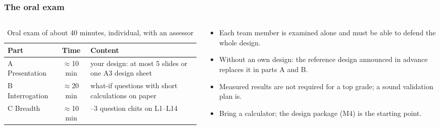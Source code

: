 \begin{frame}
	\frametitle{The oral exam}
	\begin{columns}[T]
		\begin{column}{0.56\textwidth}
			\begin{table}
				\centering
				\footnotesize
				\begin{tabular}{|l|c|>{\raggedright\arraybackslash}p{3.3cm}|}
					\hline
					\textbf{Part}   & \textbf{Time}    & \textbf{Content}                                     \\
					\hline
					A Presentation  & $\approx$10\,min & your design: at most 5 slides or one A3 design sheet \\
					B Interrogation & $\approx$20\,min & what-if questions with short calculations on paper   \\
					C Breadth       & $\approx$10\,min & 2--3 question chits on L1--L14                       \\
					\hline
				\end{tabular}
				\caption{Oral exam of about 40 minutes, individual, with an assessor}
			\end{table}
		\end{column}
		\begin{column}{0.41\textwidth}
			\small
			\begin{itemize}
				\item Each team member is examined alone and must be able to defend the whole design.
				\item Without an own design: the reference design announced in advance replaces it in parts A and B.
				\item Measured results are not required for a top grade; a sound validation plan is.
				\item Bring a calculator; the design package (M4) is the starting point.
			\end{itemize}
		\end{column}
	\end{columns}
\end{frame}

